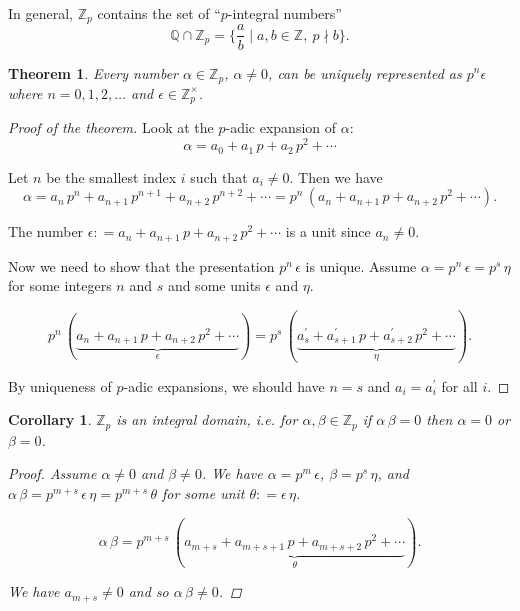 \documentclass{article}
\newcommand{\dfn}{\mathrel{\mathop:}=}
\newcommand{\ZZ}{\mathbb{Z}}
\newcommand{\QQ}{\mathbb{Q}}
\theoremstyle{myplain}
\newtheorem{theorem}[proposition]{Theorem}
\newtheorem{corollary}[proposition]{Corollary}
\theoremstyle{mydefinition}
\begin{document}
In general, $\ZZ_p$ contains the set of ``$p$-integral numbers''
$$\QQ \cap \ZZ_p = \{ \frac{a}{b} \mid a,b \in \ZZ, ~ p \nmid b \}.$$

\begin{theorem}
  Every number $\alpha \in \ZZ_p$, $\alpha\ne 0$, can be uniquely represented as
  $p^n \epsilon$ where $n = 0,1,2,\ldots$ and $\epsilon \in \ZZ_p^\times$.
\end{theorem}

\begin{proof}[Proof of the theorem]
  Look at the $p$-adic expansion of $\alpha$:
  $$\alpha = a_0 + a_1\,p + a_2\,p^2 + \cdots$$

  Let $n$ be the smallest index $i$ such that $a_i \ne 0$. Then we have
  \[ \alpha = a_n\,p^n + a_{n+1}\,p^{n+1} + a_{n+2}\,p^{n+2} + \cdots =
    p^n\,(a_n + a_{n+1}\,p + a_{n+2}\,p^2 + \cdots). \]

  The number $\epsilon \dfn a_n + a_{n+1}\,p + a_{n+2}\,p^2 + \cdots$ is a unit
  since $a_n \ne 0$.

  \vspace{1em}

  Now we need to show that the presentation $p^n\,\epsilon$ is unique. Assume
  $\alpha = p^n\,\epsilon = p^s\,\eta$ for some integers $n$ and $s$ and some
  units $\epsilon$ and $\eta$.

  \[ p^n\,(\underbrace{a_n + a_{n+1}\,p + a_{n+2}\,p^2 + \cdots}_\epsilon) =
    p^s\,(\underbrace{a_s^\prime + a_{s+1}^\prime\,p + a_{s+2}^\prime\,p^2 + \cdots}_\eta). \]

  By uniqueness of $p$-adic expansions, we should have $n = s$ and
  $a_i = a_i^\prime$ for all $i$.
\end{proof}

\begin{corollary}
  $\ZZ_p$ is an integral domain, i.e. for $\alpha,\beta \in \ZZ_p$ if
  $\alpha\,\beta = 0$ then $\alpha = 0$ or $\beta = 0$.

  \begin{proof}
    Assume $\alpha \ne 0$ and $\beta \ne 0$. We have $\alpha = p^m\,\epsilon$,
    $\beta = p^s\,\eta$, and
    $\alpha\,\beta = p^{m+s}\,\epsilon\,\eta = p^{m+s}\,\theta$ for some unit
    $\theta \dfn \epsilon\,\eta$.

    \[ \alpha\,\beta = p^{m+s} \, (\underbrace{a_{m+s} + a_{m+s+1}\,p + a_{m+s+2}\,p^2 + \cdots}_\theta). \]

    We have $a_{m+s} \ne 0$ and so $\alpha\,\beta \ne 0$.
  \end{proof}
\end{corollary}
\end{document}
